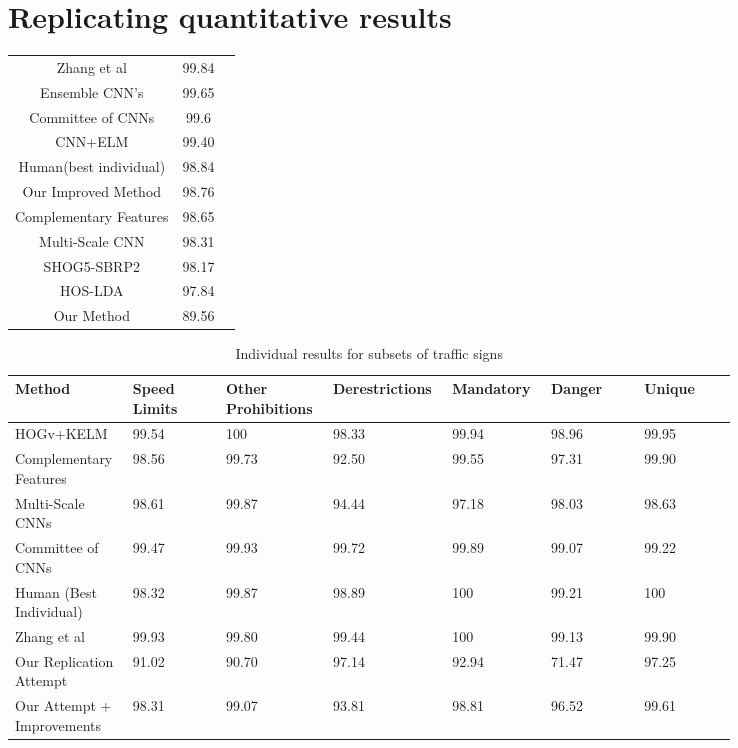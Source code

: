 \documentclass[conference]{IEEEtran}
\begin{document}
\section{Replicating quantitative results}
\begin{center}
\begin{tabular}{ |c|c|c| }
 \hline
 Zhang et al & 99.84 \\ 
 Ensemble CNN's & 99.65 \\
 Committee of CNNs & 99.6 \\ 
 CNN+ELM & 99.40 \\
 Human(best individual) & 98.84 \\
 Our Improved Method & 98.76 \\
 Complementary Features & 98.65 \\
 Multi-Scale CNN & 98.31 \\
 SHOG5-SBRP2 & 98.17 \\
 HOS-LDA & 97.84 \\
 Our Method & 89.56 \\
 
 \hline
\end{tabular}
\end{center}
\begin{table}[t]
\caption{Individual results for subsets of traffic signs}
\centering
\begin{tabular}{p{0.12\linewidth}p{0.12\linewidth}p{0.12\linewidth}p{0.12\linewidth}p{0.12\linewidth}p{0.12\linewidth}p{0.12\linewidth}}
\hline
Method & Speed Limits & Other Prohibitions & Derestrictions & Mandatory & Danger & Unique \\
\hline
HOGv+KELM & 99.54 & 100 & 98.33 & 99.94 & 98.96 & 99.95 \\
\hline
Complementary Features & 98.56 & 99.73 & 92.50 & 99.55 & 97.31 & 99.90 \\
\hline
Multi-Scale CNNs  & 98.61 & 99.87 & 94.44 & 97.18 & 98.03 & 98.63 \\
\hline
Committee of CNNs & 99.47 & 99.93 & 99.72 & 99.89 & 99.07 & 99.22 \\
\hline
Human (Best Individual) & 98.32 & 99.87 & 98.89 & 100 & 99.21 & 100 \\
\hline
Zhang et al & 99.93 & 99.80 & 99.44 & 100 & 99.13 & 99.90 \\
\hline
Our Replication Attempt & 91.02 & 90.70 & 97.14 & 92.94 & 71.47 & 97.25 \\
\hline
Our Attempt + Improvements & 98.31 & 99.07 & 93.81 & 98.81 & 96.52 & 99.61 \\
\end{tabular}
\end{table}
\end{document}
